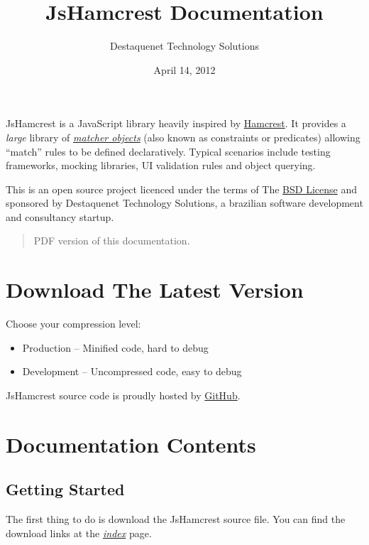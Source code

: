 \documentclass[letterpaper,10pt,english]{sphinxmanual}
\title{JsHamcrest Documentation}
\date{April 14, 2012}
\author{Destaquenet Technology Solutions}
\begin{document}
\maketitle
\tableofcontents
{}\label{index::doc}


JsHamcrest is a JavaScript library heavily inspired by \href{http://code.google.com/p/hamcrest}{Hamcrest}. It provides
a \emph{large} library of {\hyperref[modules/matchers:module-matchers]{\emph{matcher objects}}} (also known as
constraints or predicates) allowing ``match'' rules to be defined declaratively.
Typical scenarios include testing frameworks, mocking libraries, UI validation
rules and object querying.

This is an open source project licenced under the terms of The
\href{http://www.opensource.org/licenses/bsd-license.php}{BSD License} and sponsored by Destaquenet Technology Solutions, a
brazilian software development and consultancy startup.
\begin{quote}




PDF version of
this documentation.


\end{quote}


\chapter{Download The Latest Version}
\label{index:download-the-latest-version}\label{index:doc-index}\label{index:jshamcrest-library-of-matcher-objects-for-javascript}
Choose your compression level:
\begin{itemize}
\item {} 
Production -- Minified code, hard to debug

\item {} 
Development -- Uncompressed code, easy to debug

\end{itemize}

JsHamcrest source code is proudly hosted by \href{http://github.com/danielfm/jshamcrest/tree/master}{GitHub}.


\chapter{Documentation Contents}
\label{index:documentation-contents}

\section{Getting Started}
\label{getting_started:getting-started}\label{getting_started::doc}
The first thing to do is download the JsHamcrest source file. You can find the
download links at the {\hyperref[getting_started:doc-index]{\emph{index}}} page.
\end{document}
